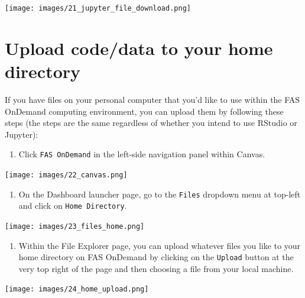 \documentclass[]{book}
\providecommand{\tightlist}{%
  \setlength{\itemsep}{0pt}\setlength{\parskip}{0pt}}
\begin{document}
\texttt{[image: images/21\_jupyter\_file\_download.png]}

\hypertarget{upload-codedata-to-your-home-directory}{%
\chapter{Upload code/data to your home directory}\label{upload-codedata-to-your-home-directory}}

If you have files on your personal computer that you'd like to use within the FAS OnDemand computing environment, you can upload them by following these steps (the steps are the same regardless of whether you intend to use RStudio or Jupyter):

\begin{enumerate}
\def\labelenumi{\arabic{enumi}.}
\tightlist
\item
  Click \texttt{FAS\ OnDemand} in the left-side navigation panel within Canvas.
\end{enumerate}

\texttt{[image: images/22\_canvas.png]}

\begin{enumerate}
\def\labelenumi{\arabic{enumi}.}
\setcounter{enumi}{1}
\tightlist
\item
  On the Dashboard launcher page, go to the \texttt{Files} dropdown menu at top-left and click on \texttt{Home\ Directory}.
\end{enumerate}

\texttt{[image: images/23\_files\_home.png]}

\begin{enumerate}
\def\labelenumi{\arabic{enumi}.}
\setcounter{enumi}{2}
\tightlist
\item
  Within the File Explorer page, you can upload whatever files you like to your home directory on FAS OnDemand by clicking on the \texttt{Upload} button at the very top right of the page and then choosing a file from your local machine.
\end{enumerate}

\texttt{[image: images/24\_home\_upload.png]}
\end{document}
